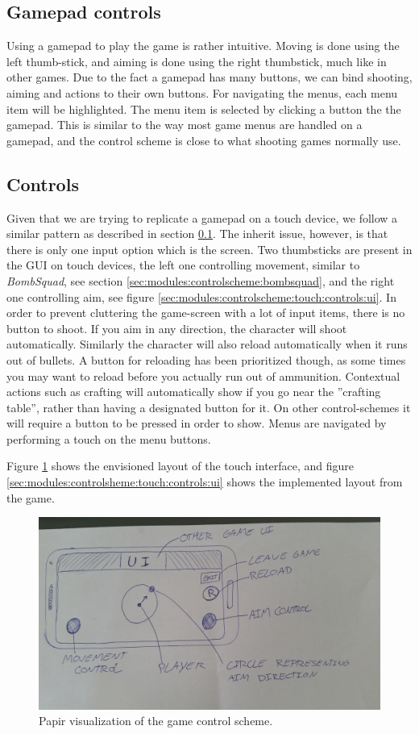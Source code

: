 \subsection{Gamepad controls}\label{sec:modules:controlscheme:gamepad:controls}
Using a gamepad to play the game is rather intuitive. Moving is done using the left thumb-stick, and aiming is done using the right thumbstick, much like in other games.
Due to the fact a gamepad has many buttons, we can bind shooting, aiming and actions to their own buttons. 
For navigating the menus, each menu item will be highlighted. The menu item is selected by clicking a button the the gamepad.
This is similar to the way most game menus are handled on a gamepad, and the control scheme is close to what shooting games normally use.

\subsection{Controls}
Given that we are trying to replicate a gamepad on a touch device, we follow a similar pattern as described in section \ref{sec:modules:controlscheme:gamepad:controls}. The inherit issue, however, is that  there is only one input option which is the screen. 
Two thumbsticks are present in the GUI on touch devices, the left one controlling movement, similar to \textit{BombSquad}, see section \ref{sec:modules:controlscheme:bombsquad}, and the right one controlling aim, see figure \ref{sec:modules:controlscheme:touch:controls:ui}.
In order to prevent cluttering the game-screen with a lot of input items, there is no button to shoot. If you aim in any direction, the character will shoot automatically. Similarly the character will also reload  automatically when it runs out of bullets. A button for reloading has been prioritized though, as some times you may want to reload before you actually run out of ammunition.
Contextual actions such as crafting will automatically show if you go near the ''crafting table'', rather than having a designated button for it. On other control-schemes it will require a button to be pressed in order to show.
Menus are navigated by performing a touch on the menu buttons. 

Figure \ref{sec:modules:controlscheme:prototype} shows the envisioned layout of the touch interface, and figure \ref{sec:modules:controlsheme:touch:controls:ui} shows the implemented layout from the game.
\begin{figure}[H]
\centering
\includegraphics[width=.75\textwidth]{figures/controlscheme/prototype}
\caption{Papir visualization of the game control scheme.}
\label{sec:modules:controlscheme:prototype}
\end{figure}

